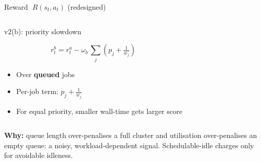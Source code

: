 \begin{frame}{Reward $\;R(s_t, a_t)$ \hfill \small\textcolor{SoftCoral}{(redesigned)}}
\begin{columns}[T,onlytextwidth]
    \hfill
      \begin{block}{v2(b): priority slowdown}
        \begin{minipage}[t][4.0cm]{\linewidth}
        $$ r^{b}_t =r^{a}_t -\omega_b\,\textstyle\sum_{j}\left( p_j +\tfrac{1}{w_j}\right) $$
        \begin{itemize}\setlength\itemsep{2pt}
          \item Over \textbf{queued} jobs
          \item Per-job term: $p_j + \tfrac{1}{w_j}$
          \item For equal priority, smaller wall-time gets larger score
        \end{itemize}
        \end{minipage}
      \end{block}
  \end{columns}

  \vspace{0.2em}
  \centering
  \textcolor{DeepBlue}{\textbf{Why:}} queue length over-penalises a full cluster and utilisation over-penalises an empty queue: a noisy, workload-dependent signal. Schedulable-idle charges only for avoidable idleness.
  \vspace{0.4em}
 


\end{frame}


